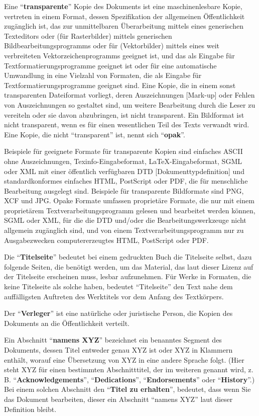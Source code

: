 Eine "`\textbf{transparente}"' Kopie des Dokuments ist eine maschinenlesbare Kopie,
vertreten in einem Format, dessen Spezifikation der allgemeinen Öffentlichkeit 
zugänglich ist, das zur unmittelbaren Überarbeitung mittels eines generischen 
Texteditors oder (für Rasterbilder) mittels generischen Bildbearbeitungsprogramms 
oder für (Vektorbilder) mittels eines weit verbreiteten Vektorzeichenprogramms geeignet
ist, und das als Eingabe für Textformatierungsprogramme geeignet ist
oder für eine automatische Umwandlung in eine Vielzahl von Formaten, die als Eingabe für 
Textformatierungsprogramme geeignet sind. Eine Kopie, die in einem sonst transparenten Dateiformat vorliegt, deren
Auszeichnungen [Mark-up] oder Fehlen von Auszeichnungen so gestaltet sind, um weitere Bearbeitung durch die
Leser zu vereiteln oder sie davon abzubringen, ist nicht transparent.
Ein Bildformat ist nicht transparent, wenn es für einen wesentlichen Teil des Texts
verwandt wird. Eine Kopie, die nicht "`transparent"' ist, nennt sich "`\textbf{opak}"'.

Beispiele für geeignete Formate für transparente Kopien sind einfaches
ASCII ohne Auszeichnungen, Texinfo-Eingabeformat, LaTeX-Eingabeformat, SGML
oder XML mit einer öffentlich verfügbaren DTD [Dokumenttypdefinition] und standardkonformes einfaches
HTML, PostScript oder PDF, die für menschliche Bearbeitung ausgelegt sind. Beispiele für
transparente Bildformate sind PNG, XCF und JPG. Opake Formate umfassen
proprietäre Formate, die nur mit einem proprietärem Textverarbeitungsprogramm gelesen und bearbeitet werden
können, SGML oder XML, für die die DTD und/oder die Bearbeitungswerkzeuge nicht allgemein zugänglich sind, und
von einem Textverarbeitungsprogramm nur zu Ausgabezwecken computererzeugtes HTML, PostScript oder PDF.

Die "`\textbf{Titelseite}"' bedeutet bei einem gedruckten Buch die Titelseite selbst,
dazu folgende Seiten, die benötigt werden, um das Material, das laut dieser Lizenz
auf der Titelseite erscheinen muss, lesbar aufzunehmen. Für Werke in Formaten,
die keine Titelseite als solche haben, bedeutet "`Titelseite"' den Text
nahe dem auffälligsten Auftreten des Werktitels vor dem Anfang des Textkörpers.

Der "`\textbf{Verleger}"' ist eine natürliche oder juristische Person, die Kopien
des Dokuments an die Öffentlichkeit verteilt.

Ein Abschnitt "`\textbf{namens XYZ}"' bezeichnet ein benanntes Segment des Dokuments, dessen
Titel entweder genau XYZ ist oder XYZ in Klammern enthält, worauf eine Übersetzung von
XYZ in eine andere Sprache folgt. (Hier steht XYZ für einen bestimmten
Abschnitttitel, der im weiteren genannt wird, z.\,B. "`\textbf{Acknowledgements}"',
"`\textbf{Dedications}"', "`\textbf{Endorsements}"' oder "`\textbf{History}"'.)  
Bei einem solchen Abschnitt den "`\textbf{Titel zu erhalten}"', bedeutet,
dass wenn Sie das Dokument bearbeiten, dieser ein Abschnitt "`namens XYZ"' 
laut dieser Definition bleibt.

